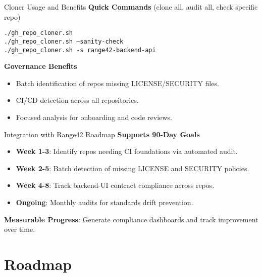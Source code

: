 \documentclass[aspectratio=169]{beamer}
\begin{document}
\begin{frame}{Cloner Usage and Benefits}
  \faTerminal\;
  \textbf{Quick Commands} (clone all, audit all, check specific repo)
  \begin{tcolorbox}
    \texttt{./gh\_repo\_cloner.sh}\\[2mm]
    \texttt{./gh\_repo\_cloner.sh --sanity-check}\\[2mm]
    \texttt{./gh\_repo\_cloner.sh -s range42-backend-api}
  \end{tcolorbox}
  \textbf{Governance Benefits}
  \begin{itemize}
    \item Batch identification of repos missing LICENSE/SECURITY files.
    \item \alert{CI/CD detection} across all repositories.
    \item Focused analysis for onboarding and code reviews.
  \end{itemize}
\end{frame}

\begin{frame}{Integration with Range42 Roadmap}
  \faRocket\;
  \textbf{Supports 90-Day Goals}
  \begin{itemize}
    \item \textbf{Week 1-3}: Identify repos needing CI foundations via automated audit.
    \item \textbf{Week 2-5}: Batch detection of missing LICENSE and SECURITY policies.
    \item \textbf{Week 4-8}: Track backend-UI contract compliance across repos.
    \item \textbf{Ongoing}: Monthly audits for standards drift prevention.
  \end{itemize}
  \begin{tcolorbox}
    \faLightbulb\; \textbf{Measurable Progress}: Generate compliance dashboards and track improvement over time.
  \end{tcolorbox}
\end{frame}

\section{Roadmap}
\end{document}

